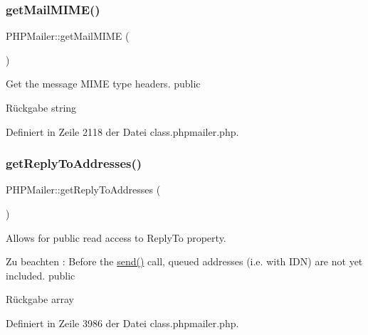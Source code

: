 \subsubsection{\texorpdfstring{get\+Mail\+M\+I\+M\+E()}{getMailMIME()}}
{\footnotesize\ttfamily P\+H\+P\+Mailer\+::get\+Mail\+M\+I\+ME (\begin{DoxyParamCaption}{ }\end{DoxyParamCaption})}

Get the message M\+I\+ME type headers.  public \begin{DoxyReturn}{Rückgabe}
string 
\end{DoxyReturn}


Definiert in Zeile 2118 der Datei class.\+phpmailer.\+php.

\mbox{\label{class_p_h_p_mailer_a158031d49131fcfa354986010796a967}} 
\subsubsection{\texorpdfstring{get\+Reply\+To\+Addresses()}{getReplyToAddresses()}}
{\footnotesize\ttfamily P\+H\+P\+Mailer\+::get\+Reply\+To\+Addresses (\begin{DoxyParamCaption}{ }\end{DoxyParamCaption})}

Allows for public read access to \textquotesingle{}Reply\+To\textquotesingle{} property. \begin{DoxyNote}{Zu beachten}
\+: Before the \mbox{\hyperlink{class_p_h_p_mailer_afdd4742f07cfb0bfa7be86ce20468fa3}{send()}} call, queued addresses (i.\+e. with I\+DN) are not yet included.  public 
\end{DoxyNote}
\begin{DoxyReturn}{Rückgabe}
array 
\end{DoxyReturn}


Definiert in Zeile 3986 der Datei class.\+phpmailer.\+php.

\mbox{\label{class_p_h_p_mailer_aec6ce40e288b3a467d1f02eb4ebcca0d}} 
